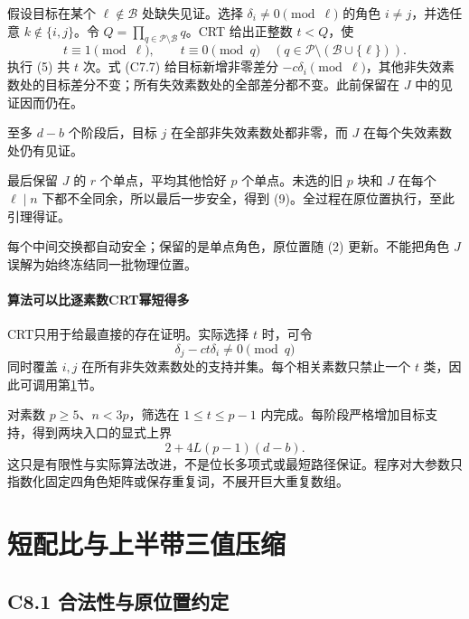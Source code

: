 {假设目标在某个} \(\ell\notin\mathcal B\) {处缺失见证。选择} \(\delta_i\ne0\pmod\ell\) {的角色} \(i\ne j\){，并选任意} \(k\notin\{i,j\}\){。令} \(Q=\prod_{q\in\mathcal P\setminus\mathcal B}q\){。CRT} {给出正整数} \(t<Q\){，使} \[
t\equiv1\pmod\ell,\qquad
t\equiv0\pmod q\quad(q\in\mathcal P\setminus(\mathcal B\cup\{\ell\})).
\] {执行} {(5)} {共} \(t\) {次。式} {(C7.7)} {给目标新增非零差分} \(-c\delta_i\pmod\ell\){，其他非失效素数处的目标差分不变；所有失效素数处的全部差分都不变。此前保留在} \(J\) {中的见证因而仍在。}

{至多} \(d-b\) {个阶段后，目标} \(j\) {在全部非失效素数处都非零，而} \(J\) {在每个失效素数处仍有见证。}

{最后保留} \(J\) {的} \(r\) {个单点，平均其他恰好} \(p\) {个单点。未选的旧} \(p\) {块和} \(J\) {在每个} \(\ell\mid n\) {下都不全同余，所以最后一步安全，得到} {(9)。全过程在原位置执行，至此引理得证。}

{每个中间交换都自动安全；保留的是单点角色，原位置随} {(2)} {更新。不能把角色} \(J\) {误解为始终冻结同一批物理位置。}

\paragraph*{\texorpdfstring{{算法可以比逐素数CRT幂短得多}}{算法可以比逐素数CRT幂短得多}}\label{C7-h44}

{CRT只用于给最直接的存在证明。实际选择} \(t\) {时，可令} \[
\delta_j-ct\delta_i\ne0\pmod q
\] {同时覆盖} \(i,j\) {在所有非失效素数处的支持并集。每个相关素数只禁止一个} \(t\) {类，因此可调用}第\ref{construct:short-choice}节{。}

{对素数} \(p\ge5\){、}\(n<3p\){，筛选在} \(1\le t\le p-1\) {内完成。每阶段严格增加目标支持，得到两块入口的显式上界} \[
2+4L(p-1)(d-b).\tag{C7.10}
\] {这只是有限性与实际算法改进，不是位长多项式或最短路径保证。程序对大参数只指数化固定四角色矩阵或保存重复词，不展开巨大重复数组。}


\section{短配比与上半带三值压缩}\label{construct:short-choice}
\subsection*{\texorpdfstring{{C8.1} {合法性与原位置约定}}{C8.1 合法性与原位置约定}}\label{C8-h45}

